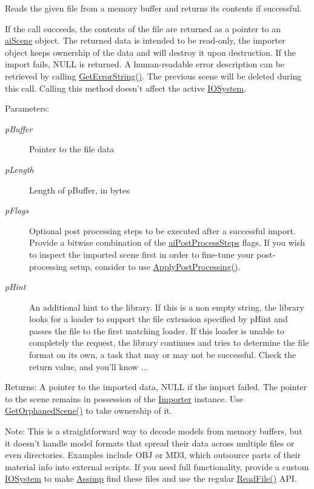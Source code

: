 Reads the given file from a memory buffer and returns its contents if successful.

If the call succeeds, the contents of the file are returned as a pointer to an \hyperlink{structai_scene}{aiScene} object. The returned data is intended to be read-only, the importer object keeps ownership of the data and will destroy it upon destruction. If the import fails, NULL is returned. A human-readable error description can be retrieved by calling \hyperlink{class_assimp_1_1_importer_23bab5ba8cb9b6886c690a610766668b}{GetErrorString()}. The previous scene will be deleted during this call. Calling this method doesn't affect the active \hyperlink{class_assimp_1_1_i_o_system}{IOSystem}. \begin{Desc}
\item[Parameters:]
\begin{description}
\item[{\em pBuffer}]Pointer to the file data \item[{\em pLength}]Length of pBuffer, in bytes \item[{\em pFlags}]Optional post processing steps to be executed after a successful import. Provide a bitwise combination of the \hyperlink{postprocess_8h_64795260b95f5a4b3f3dc1be4f52e410}{aiPostProcessSteps} flags. If you wish to inspect the imported scene first in order to fine-tune your post-processing setup, consider to use \hyperlink{class_assimp_1_1_importer_5872e749c1451fee64183fc14f1fc81d}{ApplyPostProcessing()}. \item[{\em pHint}]An additional hint to the library. If this is a non empty string, the library looks for a loader to support the file extension specified by pHint and passes the file to the first matching loader. If this loader is unable to completely the request, the library continues and tries to determine the file format on its own, a task that may or may not be successful. Check the return value, and you'll know ... \end{description}
\end{Desc}
\begin{Desc}
\item[Returns:]A pointer to the imported data, NULL if the import failed. The pointer to the scene remains in possession of the \hyperlink{class_assimp_1_1_importer}{Importer} instance. Use \hyperlink{class_assimp_1_1_importer_60eb9042fb85bfbd61a863e131a56ecd}{GetOrphanedScene()} to take ownership of it.\end{Desc}
\begin{Desc}
\item[Note:]This is a straightforward way to decode models from memory buffers, but it doesn't handle model formats that spread their data across multiple files or even directories. Examples include OBJ or MD3, which outsource parts of their material info into external scripts. If you need full functionality, provide a custom \hyperlink{class_assimp_1_1_i_o_system}{IOSystem} to make \hyperlink{namespace_assimp}{Assimp} find these files and use the regular \hyperlink{class_assimp_1_1_importer_174418ab41d5b8bc51a044895cb991e5}{ReadFile()} API. \end{Desc}
